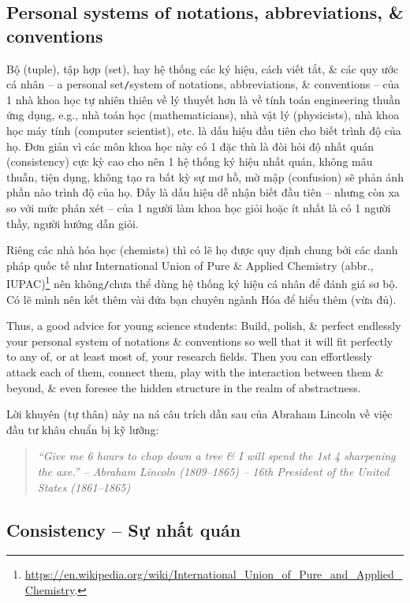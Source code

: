 \documentclass[12pt,twoside]{book}
\begin{document}
\subsection{Personal systems of notations, abbreviations, \& conventions}
Bộ (tuple), tập hợp (set), hay hệ thống các ký hiệu, cách viết tắt, \& các quy ước cá nhân -- a personal set{\tt/}system of notations, abbreviations, \& conventions -- của 1 nhà khoa học tự nhiên thiên về lý thuyết hơn là về tính toán engineering thuần ứng dụng, e.g., nhà toán học (mathematicians), nhà vật lý (physicists), nhà khoa học máy tính (computer scientist), etc. là dấu hiệu đầu tiên cho biết trình độ của họ. Đơn giản vì các môn khoa học này có 1 đặc thù là đòi hỏi độ nhất quán (consistency) cực kỳ cao cho nên 1 hệ thống ký hiệu nhất quán, không mâu thuẫn, tiện dụng, không tạo ra bất kỳ sự mơ hồ, mờ mập (confusion) sẽ phản ánh phần nào trình độ của họ. Đấy là dấu hiệu dễ nhận biết đầu tiên -- nhưng còn xa so với mức phán xét -- của 1 người làm khoa học giỏi hoặc ít nhất là có 1 người thầy, người hướng dẫn giỏi.

Riêng các nhà hóa học (chemists) thì có lẽ họ được quy định chung bởi các danh pháp quốc tế như International Union of Pure \& Applied Chemistry (abbr., IUPAC)\footnote{\url{https://en.wikipedia.org/wiki/International_Union_of_Pure_and_Applied_Chemistry}.} nên không{\tt/}chưa thể dùng hệ thống ký hiệu cá nhân để đánh giá sơ bộ. Có lẽ mình nên kết thêm vài đứa bạn chuyên ngành Hóa để hiểu thêm (vừa đủ).

Thus, a good advice for young science students: Build, polish, \& perfect endlessly your personal system of notations \& conventions so well that it will fit perfectly to any of, or at least most of, your research fields. Then you can effortlessly attack each of them, connect them, play with the interaction between them \& beyond, \& even foresee the hidden structure in the realm of abstractness.

Lời khuyên (tự thân) này na ná câu trích dẫn sau của Abraham Lincoln về việc đầu tư khâu chuẩn bị kỹ lưỡng:
\begin{quote}\it
	``Give me 6 hours to chop down a tree \& I will spend the 1st 4 sharpening the axe.'' -- {\sc Abraham Lincoln} (1809--1865) -- 16th President of the United States (1861--1865)
\end{quote}

\subsection{Consistency -- Sự nhất quán}
\end{document}
